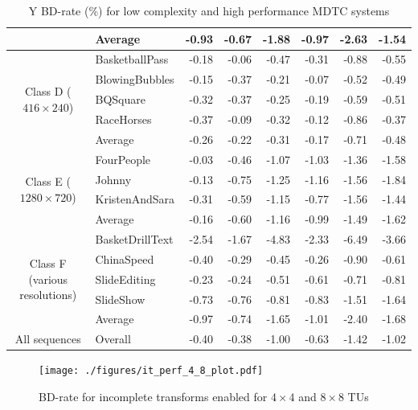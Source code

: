 \documentclass[11pt,a4paper,openright,twoside]{book}
\def\usepdfs{1} %
\numberwithin{equation}{section} %
\numberwithin{figure}{section} %
\numberwithin{table}{section} %
\begin{document}
\begin{table}[tb]
\begin{tabularx}{\textwidth}{c|X|rr|rr|rr}
		\cline{2-8} &
		Average                  & -0.93 & -0.67 & -1.88 & -0.97 & -2.63 & -1.54 \\
		\hline
		\hline
		\multirow{5}{2cm}{\centering Class D ($416\times240$)}
		& BasketballPass         & -0.18 & -0.06 & -0.47 & -0.31 & -0.88 & -0.55 \\
		& BlowingBubbles         & -0.15 & -0.37 & -0.21 & -0.07 & -0.52 & -0.49 \\
		& BQSquare               & -0.32 & -0.37 & -0.25 & -0.19 & -0.59 & -0.51 \\
		& RaceHorses             & -0.37 & -0.09 & -0.32 & -0.12 & -0.86 & -0.37 \\
		\cline{2-8} &
		Average                  & -0.26 & -0.22 & -0.31 & -0.17 & -0.71 & -0.48 \\
		\hline
		\hline
		\multirow{4}{2cm}{\centering Class E ($1280\times720$)}
		& FourPeople             & -0.03 & -0.46 & -1.07 & -1.03 & -1.36 & -1.58 \\
		& Johnny                 & -0.13 & -0.75 & -1.25 & -1.16 & -1.56 & -1.84 \\
		& KristenAndSara         & -0.31 & -0.59 & -1.15 & -0.77 & -1.56 & -1.44 \\
		\cline{2-8} &
		Average                  & -0.16 & -0.60 & -1.16 & -0.99 & -1.49 & -1.62 \\
		\hline
		\hline
		\multirow{5}{2cm}{\centering Class F (various resolutions)}
		& BasketDrillText        & -2.54 & -1.67 & -4.83 & -2.33 & -6.49 & -3.66 \\
		& ChinaSpeed             & -0.40 & -0.29 & -0.45 & -0.26 & -0.90 & -0.61 \\
		& SlideEditing           & -0.23 & -0.24 & -0.51 & -0.61 & -0.71 & -0.81 \\
		& SlideShow              & -0.73 & -0.76 & -0.81 & -0.83 & -1.51 & -1.64 \\
		\cline{2-8} &
		Average                  & -0.97 & -0.74 & -1.65 & -1.01 & -2.40 & -1.68 \\
		\hline
		\hline
		All sequences &
		Overall                  & -0.40 & -0.38 & -1.00 & -0.63 & -1.42 & -1.02 \\
	\end{tabularx}
	\caption{Y \acs{BD}-rate (\%) for low complexity and high performance \acs{MDTC} systems}
	\label{tab:bd_rate_it}
\end{table}

\begin{figure}[tb]
	\centering
	\ifthenelse{\usepdfs = 0}
	{}
	{\texttt{[image: ./figures/it\_perf\_4\_8\_plot.pdf]}}
	\caption{\acs{BD}-rate for incomplete transforms enabled for $4\times4$
	and $8\times8$ \acsp{TU}}
	\label{fig:it_perf_4_8}
\end{figure}
\end{document}
